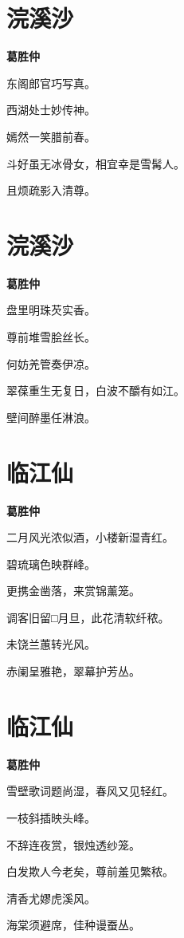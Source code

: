\documentclass[12pt,a4paper]{ctexbook}
\begin{document}
\section{浣溪沙}
\textbf{葛胜仲}\par\vspace{0.5em}
东阁郎官巧写真。\par
西湖处士妙传神。\par
嫣然一笑腊前春。\par
斗好虽无冰骨女，相宜幸是雪髯人。\par
且烦疏影入清尊。\par

\section{浣溪沙}
\textbf{葛胜仲}\par\vspace{0.5em}
盘里明珠芡实香。\par
尊前堆雪脍丝长。\par
何妨羌管奏伊凉。\par
翠葆重生无复日，白波不釂有如江。\par
壁间醉墨任淋浪。\par

\section{临江仙}
\textbf{葛胜仲}\par\vspace{0.5em}
二月风光浓似酒，小楼新湿青红。\par
碧琉璃色映群峰。\par
更携金凿落，来赏锦薰笼。\par
调客旧留□月旦，此花清软纤秾。\par
未饶兰蕙转光风。\par
赤阑呈雅艳，翠幕护芳丛。\par

\section{临江仙}
\textbf{葛胜仲}\par\vspace{0.5em}
雪壁歌词题尚湿，春风又见轻红。\par
一枝斜插映头峰。\par
不辞连夜赏，银烛透纱笼。\par
白发欺人今老矣，尊前羞见繁秾。\par
清香尤嫪虎溪风。\par
海棠须避席，佳种谩蚕丛。\par
\end{document}
